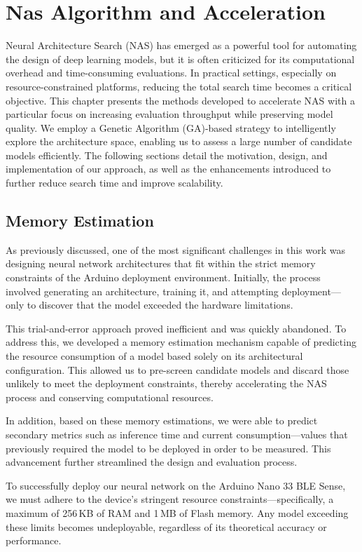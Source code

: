 \chapter{Nas Algorithm and Acceleration}

Neural Architecture Search (NAS) has emerged as a powerful tool for automating the design of deep learning models, but it is often criticized for its computational overhead and time-consuming evaluations. In practical settings, especially on resource-constrained platforms, reducing the total search time becomes a critical objective. This chapter presents the methods developed to accelerate NAS with a particular focus on increasing evaluation throughput while preserving model quality. We employ a Genetic Algorithm (GA)-based strategy to intelligently explore the architecture space, enabling us to assess a large number of candidate models efficiently. The following sections detail the motivation, design, and implementation of our approach, as well as the enhancements introduced to further reduce search time and improve scalability.

\section{Memory Estimation}

As previously discussed, one of the most significant challenges in this work was designing neural network architectures that fit within the strict memory constraints of the Arduino deployment environment. Initially, the process involved generating an architecture, training it, and attempting deployment—only to discover that the model exceeded the hardware limitations. 

This trial-and-error approach proved inefficient and was quickly abandoned. To address this, we developed a memory estimation mechanism capable of predicting the resource consumption of a model based solely on its architectural configuration. This allowed us to pre-screen candidate models and discard those unlikely to meet the deployment constraints, thereby accelerating the NAS process and conserving computational resources.

In addition, based on these memory estimations, we were able to predict secondary metrics such as inference time and current consumption—values that previously required the model to be deployed in order to be measured. This advancement further streamlined the design and evaluation process.


To successfully deploy our neural network on the Arduino Nano 33 BLE Sense, we must adhere to the device's stringent resource constraints—specifically, a maximum of 256\,KB of RAM and 1\,MB of Flash memory. Any model exceeding these limits becomes undeployable, regardless of its theoretical accuracy or performance.

